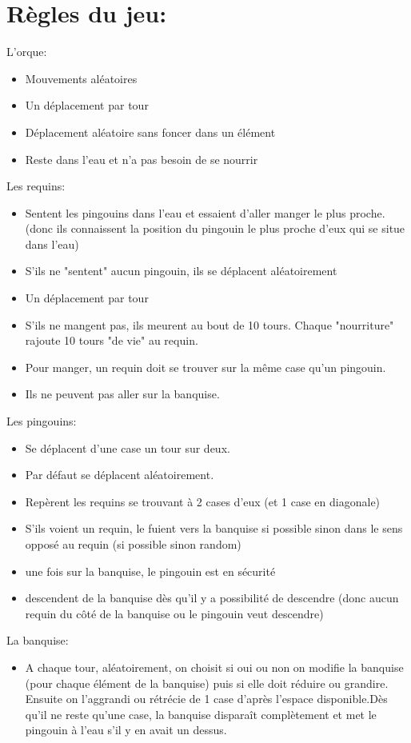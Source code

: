\documentclass[12pt]{article}
\begin{document}
{\section{Règles du jeu:}
	L'orque:
	\begin{itemize}
		\item Mouvements aléatoires
		\item Un déplacement par tour
		\item Déplacement aléatoire sans foncer dans un élément
		\item Reste dans l'eau et n'a pas besoin de se nourrir
	\end{itemize}	
	Les requins:
	\begin{itemize}
		\item Sentent les pingouins dans l'eau et essaient d'aller manger le plus proche. (donc ils connaissent la position du pingouin le plus proche d'eux qui se situe dans l'eau)
		\item S'ils ne "sentent" aucun pingouin, ils se déplacent aléatoirement
		\item Un déplacement par tour
		\item S'ils ne mangent pas, ils meurent au bout de 10 tours. Chaque "nourriture" rajoute 10 tours "de vie" au requin.
		\item Pour manger, un requin doit se trouver sur la même case qu'un pingouin.
		\item Ils ne peuvent pas aller sur la banquise.
	\end{itemize}
\newpage
	Les pingouins:
	\begin{itemize}
		\item Se déplacent d'une case un tour sur deux.
		\item Par défaut se déplacent aléatoirement.
		\item Repèrent les requins se trouvant à 2 cases d'eux (et 1 case en diagonale)
		\item S'ils voient un requin, le fuient vers la banquise si possible sinon dans le sens opposé au requin (si possible sinon random)
		\item une fois sur la banquise, le pingouin est en sécurité
		\item descendent de la banquise dès qu'il y a possibilité de descendre (donc aucun requin du côté de la banquise ou le pingouin veut descendre)
	\end{itemize}
	La banquise:
	\begin{itemize}
		\item A chaque tour, aléatoirement, on choisit si oui ou non on modifie la banquise (pour chaque élément de la banquise) puis si elle doit réduire ou grandire. Ensuite on l'aggrandi ou rétrécie de 1 case d'après l'espace disponible.\newline  Dès qu'il ne reste qu'une case, la banquise disparaît complètement et met le pingouin à l'eau s'il y en avait un dessus.

\end{itemize}}
\end{document}
